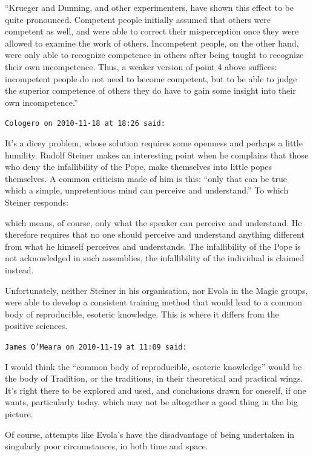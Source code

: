 \begin{footnotesize}
\begin{sffamily}
``Krueger and Dunning, and other experimenters, have shown this effect to be quite pronounced. Competent people initially assumed that others were competent as well, and were able to correct their misperception once they were allowed to examine the work of others. Incompetent people, on the other hand, were only able to recognize competence in others after being taught to recognize their own incompetence. Thus, a weaker version of point 4 above suffices: incompetent people do not need to become competent, but to be able to judge the superior competence of others they do have to gain some insight into their own incompetence.''

\hfill

\texttt{Cologero on 2010-11-18 at 18:26 said:}

It's a dicey problem, whose solution requires some openness and perhaps a little humility. Rudolf Steiner makes an interesting point when he complains that those who deny the infallibility of the Pope, make themselves into little popes themselves. A common criticism made of him is this: ``only that can be true which a simple, unpretentious mind can perceive and understand.'' To which Steiner responds:

\begin{quotex}
which means, of course, only what the speaker can perceive and understand. He therefore requires that no one should perceive and understand anything different from what he himself perceives and understands. The infallibility of the Pope is not acknowledged in such assemblies, the infallibility of the individual is claimed instead.
\end{quotex}


Unfortunately, neither Steiner in his organisation, nor Evola in the Magic groups, were able to develop a consistent training method that would lead to a common body of reproducible, esoteric knowledge. This is where it differs from the positive sciences.

\hfill

\texttt{James O'Meara on 2010-11-19 at 11:09 said:}

I would think the ``common body of reproducible, esoteric knowledge'' would be the body of Tradition, or the traditions, in their theoretical and practical wings. It's right there to be explored and used, and conclusions drawn for oneself, if one wants, particularly today, which may not be altogether a good thing in the big picture.

Of course, attempts like Evola's have the disadvantage of being undertaken in singularly poor circumstances, in both time and space.


\end{sffamily}
\end{footnotesize}
